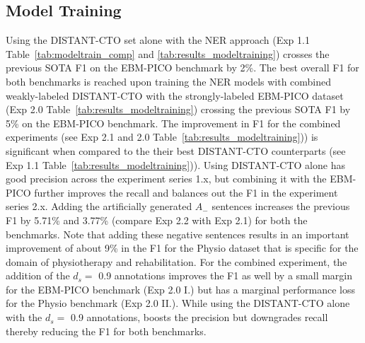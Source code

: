 \documentclass[11pt]{article}
\begin{document}
\subsection{Model Training}
\label{subsec:res_mod}
%
Using the DISTANT-CTO set alone with the NER approach (Exp 1.1 Table~\ref{tab:modeltrain_comp} and \ref{tab:results_modeltraining}) crosses the previous SOTA F1 on the EBM-PICO benchmark by 2\%.
The best overall F1 for both benchmarks is reached upon training the NER models with combined weakly-labeled DISTANT-CTO with the strongly-labeled EBM-PICO dataset (Exp 2.0 Table~\ref{tab:results_modeltraining}) crossing the previous SOTA F1 by 5\% on the EBM-PICO benchmark.
The improvement in F1 for the combined experiments (see Exp 2.1 and 2.0 Table~\ref{tab:results_modeltraining})) is significant when compared to the their best DISTANT-CTO counterparts (see Exp 1.1 Table~\ref{tab:results_modeltraining})).
Using DISTANT-CTO alone has good precision across the experiment series 1.x, but combining it with the EBM-PICO further improves the recall and balances out the F1 in the experiment series 2.x.
Adding the artificially generated $A_{-}$ sentences increases the previous F1 by 5.71\% and 3.77\% (compare Exp 2.2 with Exp 2.1) for both the benchmarks.
Note that adding these negative sentences results in an important improvement of about 9\% in the F1 for the Physio dataset that is specific for the domain of physiotherapy and rehabilitation.
For the combined experiment, the addition of the $d_s =$ 0.9 annotations improves the F1 as well by a small margin for the EBM-PICO benchmark (Exp 2.0 I.) but has a marginal performance loss for the Physio benchmark (Exp 2.0 II.).
While using the DISTANT-CTO alone with the $d_s =$ 0.9 annotations, boosts the precision but downgrades recall thereby reducing the F1 for both benchmarks.
%
%
\setlength{\tabcolsep}{4pt} 
\renewcommand{\arraystretch}{1.0}
\end{document}
